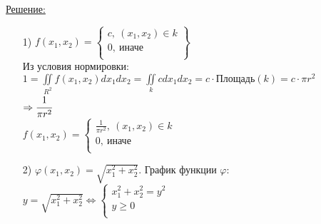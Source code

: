 \underline{Решение:} \\
\begin{enumerate}
	\item[1)] $f(x_1, x_2) = \left\{
	\begin{matrix}
		c, \  (x_1, x_2) \in k \\
		0, \ \text{иначе} \\
	\end{matrix} \right\}$ \\
	Из условия нормировки: \\
	$\displaystyle  1 = \iint\limits_{R^2} f(x_1, x_2) dx_1 dx_2 = \iint\limits_k c dx_1 dx_2 = c \cdot \text{Площадь}(k) = c \cdot \pi r^2$ \\
	$\Rightarrow \cfrac{1}{\pi r^2}$ \\
	$f(x_1, x_2) = 
	\begin{cases}
		\tfrac{1}{\pi r^2}, \ (x_1, x_2) \in k \\
		0, \ \text{иначе} \\
	\end{cases}$ \\
	
	\item[2)] $\varphi(x_1, x_2) = \sqrt{x_1^2 + x_2^2}$. График функции 
	$\varphi$: $y = \sqrt{x^2_1 + x^2_2} \Leftrightarrow 
	\begin{cases}
		x_1^2 + x_2^2 = y^2 \\
		y \geqslant 0 \\
	\end{cases}$ \\
	

\end{enumerate}
